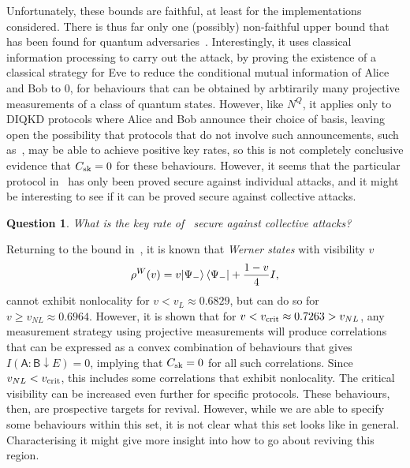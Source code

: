 \documentclass[10pt, a4paper]{article}
\numberwithin{equation}{section} %
\theoremstyle{definition}
\theoremstyle{plain}
\newtheorem{question}{Question}
\newcommand{\?}{\mathrel{?}} %
\newcommand{\crv}[1]{\mathsf{#1}}
\newcommand{\sk}{\rm sk}
\newcommand{\crit}{\rm crit}
\begin{document}
      Unfortunately, these bounds are faithful, at least for the implementations considered. There is thus far only one (possibly) non-faithful upper bound that has been found for quantum adversaries~\cite{NotSufficient}. Interestingly, it uses classical information processing to carry out the attack, by proving the existence of a classical strategy for Eve to reduce the conditional mutual information of Alice and Bob to 0, for behaviours that can be obtained by arbtirarily many projective measurements of a class of quantum states. However, like \(N^Q\), it applies only to DIQKD protocols where Alice and Bob announce their choice of basis, leaving open the possibility that protocols that do not involve such announcements, such as~\cite{NonstandardProtocol}, may be able to achieve positive key rates, so this is not completely conclusive evidence that \(C_{\sk} = 0\) for these behaviours. However, it seems that the particular protocol in~\cite{NonstandardProtocol} has only been proved secure against individual attacks, and it might be interesting to see if it can be proved secure against collective attacks.

      \begin{question}
        What is the key rate of~\cite{NonstandardProtocol} secure against collective attacks?
      \end{question}

      Returning to the bound in~\cite{NotSufficient}, it is known that \emph{Werner states} with visibility \(v\)
      \begin{equation}
        \rho^{W}(v) = v{\ket{\Psi_-}\bra{\Psi_-}} + \frac{1-v}{4}I,
      \end{equation}
      cannot exhibit nonlocality for \(v < v_L \approx 0.6829\), but can do so for \(v \geq v_{NL} \approx 0.6964\). However, it is shown that for \(v < v_{\crit} \approx 0.7263 > v_{NL}\), any measurement strategy using projective measurements will produce correlations that can be expressed as a convex combination of behaviours that gives \(I(\crv{A}:\crv{B} \downarrow E) = 0\), implying that \(C_{\sk} = 0\) for all such correlations. Since \(v_{NL} < v_{\crit}\), this includes some correlations that exhibit nonlocality. The critical visibility can be increased even further for specific protocols. These behaviours, then, are prospective targets for revival. However, while we are able to specify some behaviours within this set, it is not clear what this set looks like in general. Characterising it might give more insight into how to go about reviving this region.
\end{document}
